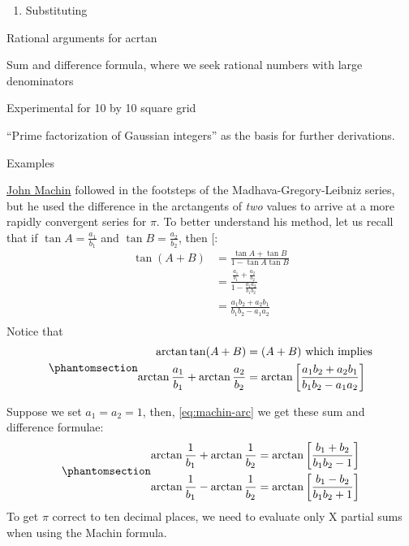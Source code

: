 \documentclass[
  a4paper,
]{article}
\providecommand{\tightlist}{%
  \setlength{\itemsep}{0pt}\setlength{\parskip}{0pt}}
\begin{document}
\begin{enumerate}
\tightlist
\item
  Substituting
\end{enumerate}

Rational arguments for acrtan

Sum and difference formula, where we seek rational numbers with large
denominators

Experimental for 10 by 10 square grid

``Prime factorization of Gaussian integers'' as the basis for further
derivations.

Examples

\href{https://en.wikipedia.org/wiki/John_Machin}{John Machin} followed
in the footsteps of the Madhava-Gregory-Leibniz series, but he used the
difference in the arctangents of \emph{two} values to arrive at a more
rapidly convergent series for \(\pi\). To better understand his method,
let us recall that if \(\tan A = \frac{a_1}{b_1}\) and
\(\tan B = \frac{a_2}{b_2}\), then
{[}\citeproc{ref-libre-inv-trig-deriv}{24}{]}: \[
\begin{aligned}
\tan(A + B) &= \frac{\tan A + \tan B}{1 - \tan A\tan B}\\
&= \frac{\frac{a_{1}}{b_{1}} + \frac{a_{2}}{b_{2}}}{1 - \frac{a_{1}a_{2}}{b_{1}b_{2}}}\\
&= \frac{a_{1}b_{2} + a_{2}b_{1}}{b_{1}b_{2} - a_{1}a_{2}}\\
\end{aligned}
\] Notice that \begin{equation}\phantomsection\label{eq:machin-arc}{
\begin{aligned}
\arctan\tan(A+B) &= (A + B) \mbox { which implies}\\
\arctan\frac{a_1}{b_1}  + \arctan\frac{a_2}{b_2} &= \arctan\left[\frac{a_{1}b_{2} + a_{2}b_{1}}{b_{1}b_{2} - a_{1}a_{2}}\right]\\
\end{aligned}
}\end{equation}

Suppose we set \(a_{1} = a_{2} = 1\), then, \cref{eq:machin-arc} we get
these sum and difference formulae:
\begin{equation}\phantomsection\label{eq:sum-diff-arct}{
\begin{aligned}
\arctan\frac{1}{b_1}  + \arctan\frac{1}{b_2} &= \arctan\left[\frac{b_{1} + b_{2}}
{b_{1}b_{2} - 1}\right]\\
\arctan\frac{1}{b_1}  - \arctan\frac{1}{b_2} &= \arctan\left[\frac{b_{1} - b_{2}}
{b_{1}b_{2} + 1}\right]
\end{aligned}
}\end{equation} To get \(\pi\) correct to ten decimal places, we need to
evaluate only X partial sums when using the Machin formula.
\end{document}
